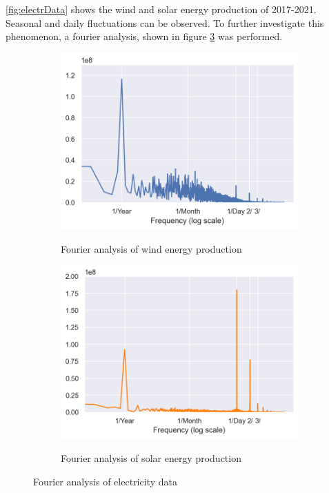 \documentclass[11pt,table]{article}
\begin{document}
\autoref{fig:electrData} shows the wind and solar energy production of 2017-2021. Seasonal and daily fluctuations can be observed. To further investigate this phenomenon, a fourier analysis, shown in figure \ref{fig:fourier} was performed.

\begin{figure}[H]
\centering
\begin{subfigure}{.5\textwidth}
  \centering
  \includegraphics[width=0.9\linewidth]{Figures/fourierWind.png}
  \label{fig:fourierWind}
  \caption{Fourier analysis of wind energy production}
\end{subfigure}%
\begin{subfigure}{.5\textwidth}
  \centering
  \includegraphics[width=0.9\linewidth]{Figures/fourierSolar.png}
  \label{fig:fourierSolar}
  \caption{Fourier analysis of solar energy production}
\end{subfigure}
\caption{Fourier analysis of electricity data}
\label{fig:fourier}
\end{figure}
\end{document}
